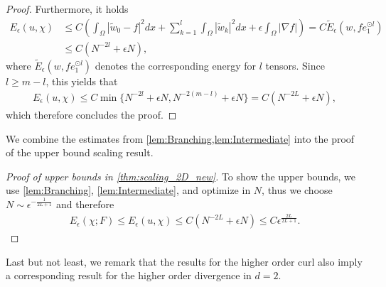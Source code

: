 \documentclass[a4paper, 10pt, twoside, notitlepage]{amsart}
\theoremstyle{plain}
\begin{document}
\begin{proof}
			Furthermore, it holds
			\begin{align*}
				E_{\epsilon}(u,\chi) &\leq C \left(\int_\Omega |\tilde{w}_0 - f|^2 dx + \sum_{k=1}^{l} \int_\Omega |\tilde{w}_k|^2 dx+ \epsilon \int_\Omega |\nabla f| \right) = C \tilde{E}_\epsilon(w,fe_1^{\odot l})\\
				& \leq C (N^{-2l} + \epsilon N),
			\end{align*}
			where $\tilde{E}_\epsilon(w,fe_1^{\odot l})$ denotes the corresponding energy for $l$ tensors.
                      Since $l \geq m-l$, this yields that
                        \begin{align*}
				E_\epsilon(u,\chi) \leq C \min\{ N^{-2l} + \epsilon N, N^{-2(m-l)} + \epsilon N\} = C(N^{-2L} + \epsilon N),
			\end{align*}
                        which therefore concludes the proof.
		\end{proof}
			We combine the estimates from \cref{lem:Branching,lem:Intermediate} into the proof of the upper bound scaling result.
		
		\begin{proof}[Proof of upper bounds in \cref{thm:scaling_2D_new}]
			To show the upper bounds, we use \cref{lem:Branching}, \cref{lem:Intermediate}, and optimize in $N$, thus we choose $N \sim \epsilon^{-\frac{1}{2L+1}}$ and therefore
			\begin{align*}
				E_\epsilon(\chi;F) \leq E_\epsilon(u,\chi) \leq C (N^{-2L} + \epsilon N) \leq C\epsilon^{\frac{2L}{2L+1}}.
			\end{align*}
		\end{proof}
		
	Last but not least, we remark that the results for the higher order curl also imply a corresponding result for the higher order divergence in $d=2$.
		
\end{document}
